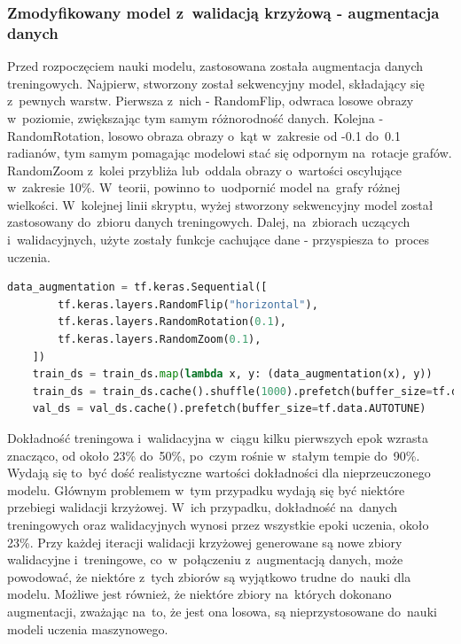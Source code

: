 \subsubsection{Zmodyfikowany model z~walidacją krzyżową - augmentacja danych}

Przed rozpoczęciem nauki modelu, zastosowana została augmentacja danych treningowych.
Najpierw, stworzony został sekwencyjny model, składający się z~pewnych warstw.
Pierwsza z~nich - RandomFlip, odwraca losowe obrazy w~poziomie, zwiększając tym samym różnorodność danych.
Kolejna - RandomRotation, losowo obraza obrazy o~kąt w~zakresie od -0.1 do~0.1 radianów,
tym samym pomagając modelowi stać się odpornym na~rotacje grafów.
RandomZoom z~kolei przybliża lub~oddala obrazy o~wartości oscylujące w~zakresie 10\%.
W~teorii, powinno to~uodpornić model na~grafy różnej wielkości.
W~kolejnej linii skryptu, wyżej stworzony sekwencyjny model został zastosowany do~zbioru danych treningowych.
Dalej, na~zbiorach uczących i~walidacyjnych, użyte zostały funkcje cachujące dane - przyspiesza to~proces uczenia.


\begin{lstlisting}[language=Python,caption=Listing zmodyfikowanego skryptu poprzedzającego tworzenie modelu z~walidacją krzyżową
	- wersja 3,label={tests-model-crossval3}]
	data_augmentation = tf.keras.Sequential([
        tf.keras.layers.RandomFlip("horizontal"),
        tf.keras.layers.RandomRotation(0.1),
        tf.keras.layers.RandomZoom(0.1),
    ])
    train_ds = train_ds.map(lambda x, y: (data_augmentation(x), y))
    train_ds = train_ds.cache().shuffle(1000).prefetch(buffer_size=tf.data.AUTOTUNE)
    val_ds = val_ds.cache().prefetch(buffer_size=tf.data.AUTOTUNE)
\end{lstlisting}

Dokładność treningowa i~walidacyjna w~ciągu kilku pierwszych epok wzrasta znacząco,
od około 23\% do~50\%, po~czym rośnie w~stałym tempie do~90\%.
Wydają się to~być dość realistyczne wartości dokładności dla nieprzeuczonego modelu.
Głównym problemem w~tym przypadku wydają się być niektóre przebiegi walidacji krzyżowej.
W~ich przypadku, dokładność na~danych treningowych oraz walidacyjnych wynosi przez wszystkie epoki uczenia, około 23\%.
Przy każdej iteracji walidacji krzyżowej generowane są nowe zbiory walidacyjne i~treningowe,
co~w~połączeniu z~augmentacją danych, może powodować, że niektóre z~tych zbiorów są wyjątkowo trudne do~nauki dla modelu.
Możliwe jest również, że niektóre zbiory na~których dokonano augmentacji, zważając na~to, że jest ona losowa,
są nieprzystosowane do~nauki modeli uczenia maszynowego.

